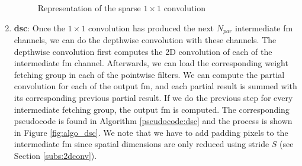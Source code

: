 \begin{enumerate}
\begin{figure}[H]
        \caption{Representation of the sparse $1 \times 1$ convolution}
        \label{fig:algo_11conv}
    \end{figure}
    \item \textbf{\acrshort{dsc}}: Once the $1 \times 1$ convolution has produced the next $N_{par}$ intermediate \acrshort{fm} channels, we can do the depthwise convolution with these channels. The depthwise convolution first computes the 2D convolution of each of the intermediate \acrshort{fm} channel. Afterwards, we can load the corresponding weight fetching group in each of the pointwise filters. We can compute the partial convolution for each of the output \acrshort{fm}, and each partial result is summed with its corresponding previous partial result. If we do the previous step for every intermediate fetching group, the output \acrshort{fm} is computed. The corresponding pseudocode is found in Algorithm \ref{pseudocode:dsc} and the process is shown in Figure \ref{fig:algo_dsc}. We note that we have to add padding pixels to the intermediate \acrshort{fm} since spatial dimensions are only reduced using stride $S$ (see Section \ref{subs:2dconv}).
    \begin{algorithm}[H]
        \centering
        \begin{algorithmic}
             
                 
                     
                         
                             
                                     
                            \EndFor
                        \EndFor
                    \EndFor
                     
                         

\end{algorithmic}
\end{algorithm}
\end{enumerate}
